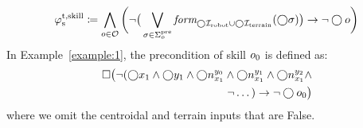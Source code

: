 \documentclass[letterpaper, 10 pt, conference]{ieeeconf}
\begin{document}
\begin{equation}\label{eq:sys_trans}
\begin{aligned}
    \varphi_\textrm{s}^\textrm{t,skill} \coloneqq 
    \bigwedge_{o \in \mathcal{O}} \bigg(
    \neg \big(
    \bigvee_{\sigma\in\Sigma_{o}^{\textrm{pre}}}
    \textit{form}_{\bigcirc{\mathcal I}_{\textrm{robot}}\cup\bigcirc{\mathcal I}_{\textrm{terrain}}}(\bigcirc\sigma)
    \big)
    \to \neg \bigcirc o
    \bigg)
\end{aligned}
\end{equation}
%
In Example~\ref{example:1}, the precondition of skill $o_{0}$ is defined as:
\begin{equation}
\begin{aligned}
     \square \big( \neg 
     (
     \bigcirc x_1 \land 
     \bigcirc y_1 \land 
     \bigcirc n_{x_1}^{y_0} \land 
     \bigcirc n_{x_1}^{y_1} \land 
     \bigcirc n_{x_1}^{y_2}\land \\
     \neg \dots)
     \to \neg \bigcirc o_{0} \big)
\end{aligned}
\end{equation}
where we omit the centroidal and terrain inputs that are False.
\end{document}
